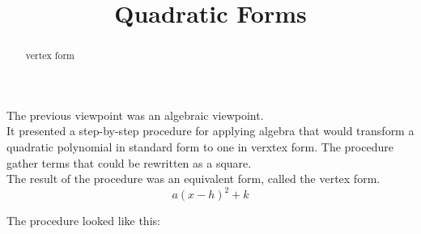 \documentclass{ximera}
\title{Quadratic Forms}
\begin{document}
\begin{abstract}
vertex form
\end{abstract}
\maketitle






The previous viewpoint was an algebraic viewpoint.  \\

It presented a step-by-step procedure for applying algebra that would transform a quadratic polynomial in standard form to one in verxtex form.  The procedure gather terms that could be rewritten as a square.  \\

The result of the procedure was an equivalent form, called the vertex form. \\


\[
a (x - h)^2 + k
\]




The procedure looked like this:
\end{document}
